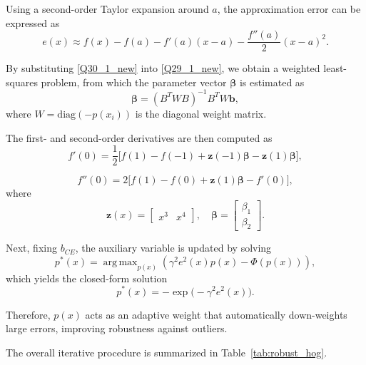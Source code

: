 \documentclass{elsarticle}
\DeclareMathOperator*{\argmax}{arg\,max}
\begin{document}
Using a second-order Taylor expansion around $a$, the approximation error can be expressed as
\begin{equation}\label{Q30_1_new}
	e(x) \approx
	f(x) - f(a)
	- f'(a)(x-a)
	- \frac{f''(a)}{2}(x-a)^2.
\end{equation}

By substituting \eqref{Q30_1_new} into \eqref{Q29_1_new}, we obtain a weighted least-squares problem, from which the parameter vector $\boldsymbol{\beta}$ is estimated as
\begin{equation}\label{Q30_2_new}
	\boldsymbol{\beta} =
	(B^T W B)^{-1} B^T W \mathbf{b},
\end{equation}
where $W = \mathrm{diag}(-p(x_i))$ is the diagonal weight matrix.

The first- and second-order derivatives are then computed as
\begin{equation}\label{Q30_3_new}
	f'(0) =
	\frac{1}{2}
	\Big[
	f(1) - f(-1)
	+ \mathbf{z}(-1)\boldsymbol{\beta}
	-
	\mathbf{z}(1)\boldsymbol{\beta}
	\Big],
\end{equation}

\begin{equation}\label{Q30_4_new}
	f''(0) =
	2\Big[
	f(1) - f(0)
	+ \mathbf{z}(1)\boldsymbol{\beta}
	- f'(0)
	\Big],
\end{equation}
where
\begin{equation}
	\mathbf{z}(x) =
	\begin{bmatrix}
		x^3 & x^4
	\end{bmatrix},
	\quad
	\boldsymbol{\beta} =
	\begin{bmatrix}
		\beta_1 \\
		\beta_2
	\end{bmatrix}.
\end{equation}

Next, fixing $b_{CE}$, the auxiliary variable is updated by solving
\begin{equation}\label{Q31_1_new}
	p^*(x) =
	\argmax_{p(x)}
	\left(
	\gamma^2 e^2(x)p(x) - \Phi(p(x))
	\right),
\end{equation}
which yields the closed-form solution
\begin{equation}\label{Q32_1_new}
	p^*(x) = -\exp\big(-\gamma^2 e^2(x)\big).
\end{equation}

Therefore, $p(x)$ acts as an adaptive weight that automatically down-weights large errors, improving robustness against outliers.

The overall iterative procedure is summarized in Table~\ref{tab:robust_hog}.
\end{document}
